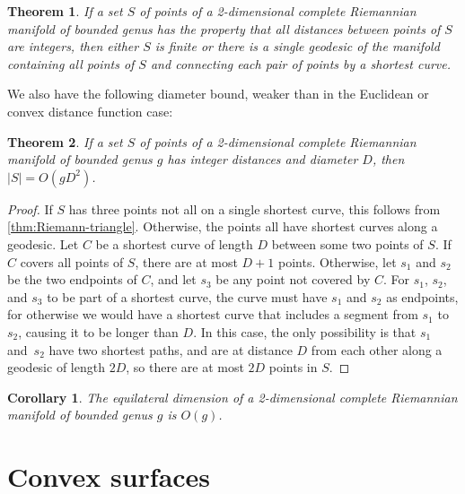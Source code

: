 \documentclass[11pt]{article}
\newtheorem{theorem}{Theorem}
\newtheorem{corollary}[lemma]{Corollary}
\theoremstyle{definition}
\begin{document}
\begin{theorem}
\label{thm:Riemann-finite}
If a set $S$ of points of a 2-dimensional complete Riemannian manifold of bounded genus has the property that all distances between points of $S$ are integers, then either $S$ is finite or there is a single geodesic of the manifold containing all points of $S$ and connecting each pair of points by a shortest curve.
\end{theorem}

We also have the following diameter bound, weaker than in the Euclidean or convex distance function case:

\begin{theorem}
\label{thm:Riemann-diameter}
If a set $S$ of points of a 2-dimensional complete Riemannian manifold of bounded genus $g$ has integer distances and diameter $D$, then $|S|=O(gD^2)$.
\end{theorem}

\begin{proof}
If $S$ has three points not all on a single shortest curve, this follows from \cref{thm:Riemann-triangle}. Otherwise, the points all have shortest curves along a geodesic. Let $C$ be a shortest curve of length $D$ between some two points of $S$. If $C$ covers all points of $S$, there are at most $D+1$ points. Otherwise, let $s_1$ and $s_2$ be the two endpoints of $C$, and let $s_3$ be any point not covered by $C$. For $s_1$, $s_2$, and $s_3$ to be part of a shortest curve, the curve must have $s_1$ and $s_2$ as endpoints, for otherwise we would have a shortest curve that includes a segment from $s_1$ to $s_2$, causing it to be longer than $D$. In this case, the only possibility is that $s_1$ and~$s_2$ have two shortest paths, and are at distance $D$ from each other along a geodesic of length $2D$, so there are at most $2D$ points in $S$.
\end{proof}

\begin{corollary}
\label{cor:equilateral-dimension}
The equilateral dimension of a 2-dimensional complete Riemannian manifold of bounded genus $g$ is $O(g)$.
\end{corollary}

\section{Convex surfaces}
\label{sec:convex}
\end{document}
